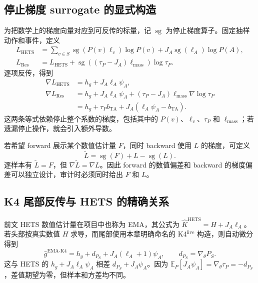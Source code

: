 \documentclass[lang=cn,scheme=chinese,openany]{../book/elegantbook}
\newcommand{\E}{\mathbb E}
\begin{document}
\subsection{停止梯度 surrogate 的显式构造}

为把数学上的梯度向量对应到可反传的标量，记 $\operatorname{sg}$ 为停止梯度算子。固定抽样动作和事件，定义
\begin{align*}
 L_{\mathrm{HETS}}
 &=\sum_{v\in S}\operatorname{sg}(P(v)\ell_v)\log P(v)
   +J_A\operatorname{sg}(\ell_A)\log P(A),\\
 L_{\mathrm{Res}}
 &=L_{\mathrm{HETS}}
   +\operatorname{sg}((\tau_P-J_A)\ell_{\mathrm{mass}})\log\tau_P.
\end{align*}
逐项反传，得到
\begin{align*}
 \nabla L_{\mathrm{HETS}}&=h_g+J_A\ell_A\psi_A,\\
 \nabla L_{\mathrm{Res}}
 &=h_g+J_A\ell_A\psi_A+(\tau_P-J_A)\ell_{\mathrm{mass}}\nabla\log\tau_P\\
 &=h_g+\tau_Pb_{\mathrm{TA}}+J_A(\ell_A\psi_A-b_{\mathrm{TA}}).
\end{align*}
这两条等式依赖停止整个系数的梯度，包括其中的 $P(v)$、$\ell_v$、$\tau_P$ 和 $\ell_{\mathrm{mass}}$；若遗漏停止操作，就会引入额外导数。

若希望 forward 展示某个数值估计量 $F$，同时 backward 使用 $L$ 的梯度，可定义
\begin{equation*}
 \widetilde L=\operatorname{sg}(F)+L-\operatorname{sg}(L).
\end{equation*}
逐样本有 $\widetilde L=F$，但 $\nabla\widetilde L=\nabla L$。因此 forward 的数值偏差和 backward 的梯度偏差可以独立设计，审计时必须同时给出 $F$ 和 $L$。

\subsection{K4 尾部反传与 HETS 的精确关系}
\label{est:sec:kl-k4-hets}

前文 HETS 数值估计量在项目中也称为 EMA，其公式为 $\widehat K^{\mathrm{HETS}}=H+J_A\ell_A$。若头部按真实数值 $H$ 求导，而尾部使用本章明确命名的 K4$^{\mathrm{live}}$ 构造，则自动微分得到
\begin{equation*}
 \widehat g^{\mathrm{EMA\text{-}K4}}
 =h_g+d_{P_S}+J_A(\ell_A+1)\psi_A,\qquad d_{P_S}=\nabla_\theta P_S.
\end{equation*}
这与 HETS 的 $h_g+J_A\ell_A\psi_A$ 相差 $d_{P_S}+J_A\psi_A$。因为 $\E_P[J_A\psi_A]=\nabla_\theta\tau_P=-d_{P_S}$，差值期望为零，但样本和方差均不同。
\end{document}
